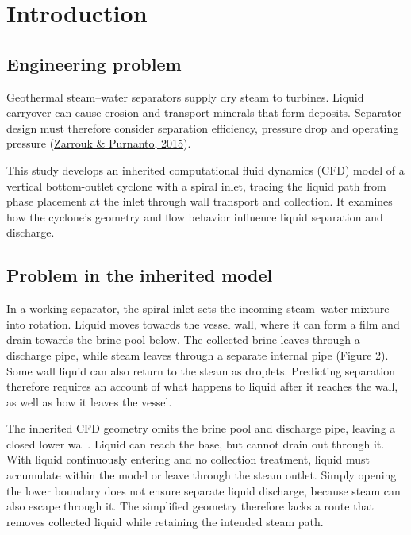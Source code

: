 \documentclass[12pt]{article}
\begin{document}
\clearpage
{}

\section{Introduction}\label{introduction}

\subsection{Engineering problem}\label{engineering-problem}

Geothermal steam--water separators supply dry steam to turbines. Liquid carryover can cause erosion and transport minerals that form deposits. Separator design must therefore consider separation efficiency, pressure drop and operating pressure (\href{https://doi.org/10.1016/j.geothermics.2014.05.009}{Zarrouk \& Purnanto, 2015}).

This study develops an inherited computational fluid dynamics (CFD) model of a vertical bottom-outlet cyclone with a spiral inlet, tracing the liquid path from phase placement at the inlet through wall transport and collection. It examines how the cyclone's geometry and flow behavior influence liquid separation and discharge.

\subsection{Problem in the inherited model}\label{problem-in-the-inherited-model}

In a working separator, the spiral inlet sets the incoming steam--water mixture into rotation. Liquid moves towards the vessel wall, where it can form a film and drain towards the brine pool below. The collected brine leaves through a discharge pipe, while steam leaves through a separate internal pipe (Figure 2). Some wall liquid can also return to the steam as droplets. Predicting separation therefore requires an account of what happens to liquid after it reaches the wall, as well as how it leaves the vessel.

The inherited CFD geometry omits the brine pool and discharge pipe, leaving a closed lower wall. Liquid can reach the base, but cannot drain out through it. With liquid continuously entering and no collection treatment, liquid must accumulate within the model or leave through the steam outlet. Simply opening the lower boundary does not ensure separate liquid discharge, because steam can also escape through it. The simplified geometry therefore lacks a route that removes collected liquid while retaining the intended steam path.
\end{document}
